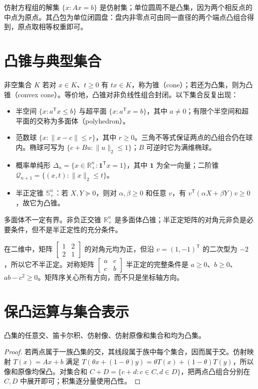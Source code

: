 \begin{example}
仿射方程组的解集 $\{x:Ax=b\}$ 是仿射集；单位圆周不是凸集，因为两个相反点的中点为原点。其凸包为单位闭圆盘：盘内非零点可由同一直径的两个端点凸组合得到，原点取相等权重即可。
\end{example}

\section{凸锥与典型集合}

非空集合 $K$ 若对 $x\in K$、$t\geq0$ 有 $tx\in K$，称为锥（cone）；若还为凸集，则为凸锥（convex cone）。等价地，凸锥对非负线性组合封闭。以下集合反复出现：
\begin{itemize}
 \item 半空间 $\{x:a^{\mathsf T}x\leq b\}$ 与超平面 $\{x:a^{\mathsf T}x=b\}$，其中 $a\ne0$；有限个半空间和超平面的交称为多面体（polyhedron）。
 \item 范数球 $\{x:\|x-c\|\leq r\}$，其中 $r\geq0$。三角不等式保证两点的凸组合仍在球内。椭球可写为 $\{c+Bu:\|u\|_2\leq1\}$；$B$ 可逆时它为满维椭球。
 \item 概率单纯形 $\Delta_n=\{x\in\mathbb R_+^n:\mathbf1^{\mathsf T}x=1\}$，其中 $\mathbf1$ 为全一向量；二阶锥 $\mathcal Q_{n+1}=\{(x,t):\|x\|_2\leq t\}$。
 \item 半正定锥 $\mathbb S_+^n$：若 $X,Y\succeq0$，则对 $\alpha,\beta\geq0$ 和任意 $v$，有 $v^{\mathsf T}(\alpha X+\beta Y)v\geq0$，故它为凸锥。
\end{itemize}
多面体不一定有界。非负正交锥 $\mathbb R_+^n$ 是多面体凸锥；半正定矩阵的对角元非负是必要条件，但不是半正定性的充分条件。

在二维中，矩阵 $\left[\begin{smallmatrix}1&2\\2&1\end{smallmatrix}\right]$ 的对角元均为正，但沿 $v=(1,-1)^{\mathsf T}$ 的二次型为 $-2$，所以它不半正定。对称矩阵 $\left[\begin{smallmatrix}a&c\\c&b\end{smallmatrix}\right]$ 半正定的完整条件是 $a\geq0$、$b\geq0$、$ab-c^2\geq0$。矩阵序关心所有方向，而不只是坐标轴方向。

\section{保凸运算与集合表示}

\begin{proposition}
凸集的任意交、笛卡尔积、仿射像、仿射原像和集合和均为凸集。
\end{proposition}
\begin{proof}
若两点属于一族凸集的交，其线段属于族中每个集合，因而属于交。仿射映射 $T(x)=Ax+b$ 满足 $T(\theta x+(1-\theta)y)=\theta T(x)+(1-\theta)T(y)$，所以像和原像均保凸。对集合和 $C+D=\{c+d:c\in C,d\in D\}$，把两点凸组合分别在 $C,D$ 中展开即可；积集逐分量使用凸性。
\end{proof}

